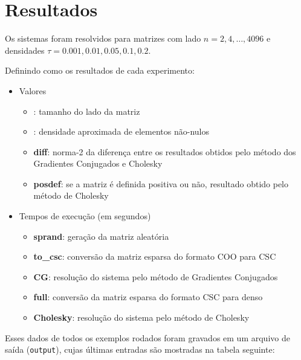 \documentclass[a4paper,11pt]{article}
\begin{document}
  \section*{Resultados}
      Os sistemas foram resolvidos para matrizes com lado $n = 2, 4, \dots, 4096$ e
      densidades $\tau = 0.001, 0.01, 0.05, 0.1, 0.2$.

      Definindo como os resultados de cada experimento:

      \begin{itemize}
      \item Valores
        \begin{itemize}
          \item {}: tamanho do lado da matriz
          \item \boldmath{$\tau$}: densidade aproximada de elementos não-nulos
          \item \textbf{diff}: norma-2 da diferença entre os resultados obtidos pelo método
          dos Gradientes Conjugados e Cholesky
          \item \textbf{posdef}: se a matriz é definida positiva ou não, resultado obtido
          pelo método de Cholesky
        \end{itemize}

      \item Tempos de execução (em segundos)
        \begin{itemize}
          \item \textbf{sprand}: geração da matriz aleatória
          \item \textbf{to\_csc}: conversão da matriz esparsa do formato COO para CSC
          \item \textbf{CG}: resolução do sistema pelo método de Gradientes Conjugados
          \item \textbf{full}: conversão da matriz esparsa do formato CSC para denso
          \item \textbf{Cholesky}: resolução do sistema pelo método de Cholesky
        \end{itemize}
    \end{itemize}
      Esses dados de todos os exemplos rodados foram gravados em um arquivo de saída (\texttt{output}),
      cujas últimas entradas são mostradas na tabela seguinte:
\end{document}
